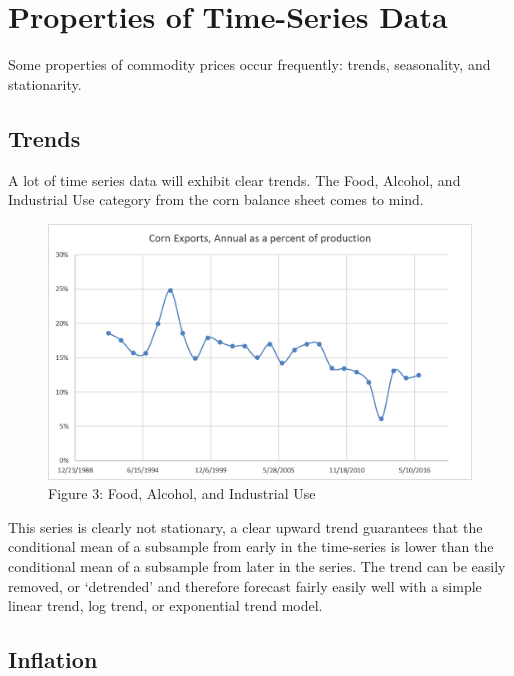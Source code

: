 \documentclass[
  letterpaper,
  DIV=11,
  numbers=noendperiod]{scrreprt}
\begin{document}
\hypertarget{properties-of-time-series-data}{%
\section{Properties of Time-Series
Data}\label{properties-of-time-series-data}}

Some properties of commodity prices occur frequently: trends,
seasonality, and stationarity.

\hypertarget{trends}{%
\subsection{Trends}\label{trends}}

A lot of time series data will exhibit clear trends. The Food, Alcohol,
and Industrial Use category from the corn balance sheet comes to mind.

\begin{figure}

{\centering \includegraphics{Excel-files/IntroductiontoCommodityTS-FeedGrains_Corn_files/image010.png}

}

\caption{Figure 3: Food, Alcohol, and Industrial Use}

\end{figure}

This series is clearly not stationary, a clear upward trend guarantees
that the conditional mean of a subsample from early in the time-series
is lower than the conditional mean of a subsample from later in the
series. The trend can be easily removed, or `detrended' and therefore
forecast fairly easily well with a simple linear trend, log trend, or
exponential trend model.

\hypertarget{inflation}{%
\subsection{Inflation}\label{inflation}}
\end{document}
